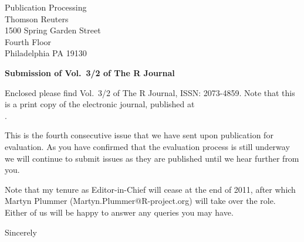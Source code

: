 \documentclass[a4]{letter}
\begin{document}
\address{Statistics Department\\University of Warwick\\Coventry\\CV4 7AL\\UK\\[12pt]Tel: +44(0)1843 583233\\Eml: Heather.Turner@r-project.org}
\signature{Heather Turner\\\textbf{Editor in Chief\\The R Journal}}
\def\today{19 December 2011}

\begin{letter}{Publication Processing \\
      Thomson Reuters\\
      1500 Spring Garden Street\\Fourth Floor\\
      Philadelphia PA 19130}
  
\opening{\textbf{Submission of Vol.\ 3/2 of The R Journal}}


Enclosed please find Vol.\ 3/2 of The R Journal, ISSN: 2073-4859. Note that this is a
print copy of the electronic journal, published at \\
{}.

This is the fourth consecutive issue that we have sent upon publication for
evaluation. As you have confirmed that the evaluation process is still
underway we will continue to submit issues as they are published until we hear
further from you.

Note that my tenure as Editor-in-Chief will cease at the end of 2011, after
which Martyn Plummer (Martyn.Plummer@R-project.org) will take over the role. Either of
us will be happy to answer any queries you may have.

\closing{Sincerely}

\end{letter}
\end{document}
